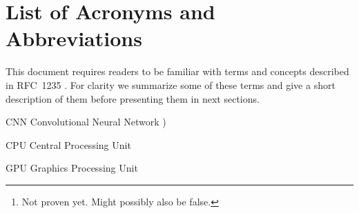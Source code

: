 \documentclass[12pt,twoside]{article}
\begin{document}
\maketitle


\begin{abstract}
\label{sec:abstract}

We compare 4 dynamic memory allocators designed for running on GPUs and select the best performing under TensorFlow’s Convolutional Neural Network (CNN) benchmark, running only the ResNet50 model. Our main metric of comparison is the number of images per second processed by the benchmark. Other metrics studied are: object sizes requested for allocation by the benchmark and the frequency in allocation request and in the sizes used. After our performance analysis, we conclude that \texttt{Halloc} algorithm is better than the already used algorithms by Tensorflow, \texttt{CUDAMalloc} and \texttt{BFCMalloc}, in the context of the benchmark itself.\footnote{Not proven yet. Might possibly also be false.}.

\textbf{Keywords:} Algorithm, Performance, Machine learning, GPU, Dynamic memory, Allocation, Tensorflow

\end{abstract}

\tableofcontents

\section*{List of Acronyms and Abbreviations}
\label{list-of-acronyms-and-abbreviations}

This document requires readers to be familiar with terms and concepts described in \mbox{RFC~1235} \cite{john_ioannidis_coherent_1991}. For clarity we summarize some of these terms and give a short description of them before presenting them in next sections.

\begin{basedescript}{\desclabelstyle{\pushlabel}\desclabelwidth{10em}}
\item[CNN]					Convolutional Neural Network \cite{postel_internet_1981})
\item[CPU]                  Central Processing Unit
\item[GPU]                  Graphics Processing Unit
\end{basedescript}


\clearpage


\end{document}
